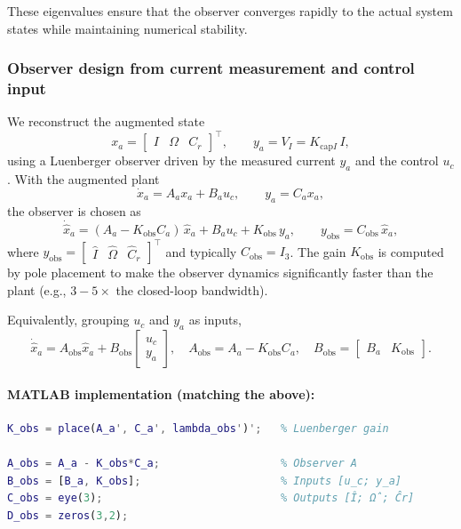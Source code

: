 \documentclass{rapportCS}
\begin{document}
\noindent These eigenvalues ensure that the observer converges rapidly to the actual system states while maintaining numerical stability.

\subsubsection{Observer design from current measurement and control input}

We reconstruct the augmented state
\[
x_a=\begin{bmatrix} I & \Omega & C_r \end{bmatrix}^\top,
\qquad y_a = V_I = K_{\mathrm{cap}I}\,I,
\]
using a Luenberger observer driven by the measured current \(y_a\) and the control \(u_c\).
With the augmented plant
\[
\dot x_a = A_a x_a + B_a u_c, \qquad y_a = C_a x_a ,
\]
the observer is chosen as
\[
\boxed{\;
\dot{\hat x}_a = (A_a - K_{\mathrm{obs}} C_a)\,\hat x_a + B_a u_c + K_{\mathrm{obs}}\,y_a,
\qquad
y_{\mathrm{obs}} = C_{\mathrm{obs}}\,\hat x_a,
\;}
\]
where \(y_{\mathrm{obs}}=\begin{bmatrix}\hat I & \hat\Omega & \hat C_r\end{bmatrix}^\top\) and typically
\(C_{\mathrm{obs}}=I_3\).
The gain \(K_{\mathrm{obs}}\) is computed by pole placement to make the observer dynamics
significantly faster than the plant (e.g., \(3\!-\!5\times\) the closed-loop bandwidth).

Equivalently, grouping \(u_c\) and \(y_a\) as inputs,
\[
\dot{\hat x}_a = A_{\mathrm{obs}}\hat x_a + B_{\mathrm{obs}}
\begin{bmatrix} u_c \\ y_a \end{bmatrix},
\quad
A_{\mathrm{obs}} = A_a - K_{\mathrm{obs}} C_a,\quad
B_{\mathrm{obs}}=\begin{bmatrix} B_a & K_{\mathrm{obs}} \end{bmatrix}.
\]

\paragraph{MATLAB implementation (matching the above):}
\begin{lstlisting}[language=Matlab]
% Given: A_a, B_a, C_a, desired observer poles lambda_obs (1x3)
K_obs = place(A_a', C_a', lambda_obs')';   % Luenberger gain

A_obs = A_a - K_obs*C_a;                   % Observer A
B_obs = [B_a, K_obs];                      % Inputs [u_c; y_a]
C_obs = eye(3);                            % Outputs [Î; Ω̂; Ĉr]
D_obs = zeros(3,2);
\end{lstlisting}
\end{document}
